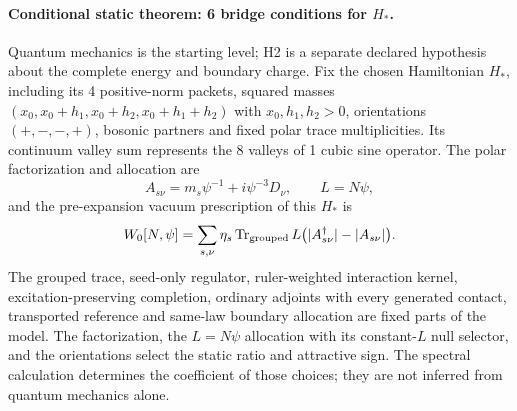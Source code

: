 
\paragraph*{Conditional static theorem: 6 bridge conditions for $H_*$.}
\label{sec:one-h-corollary}
Quantum mechanics is the starting level; H2 is a separate declared
hypothesis about the complete energy and boundary charge.
Fix the chosen Hamiltonian $H_*$, including its 4 positive-norm
packets, squared masses
$(x_0,x_0+h_1,x_0+h_2,x_0+h_1+h_2)$ with $x_0,h_1,h_2>0$,
orientations $(+,-,-,+)$, bosonic partners and fixed polar trace
multiplicities.  Its continuum valley sum represents the 8 valleys
of 1 cubic sine operator.  The polar factorization and allocation are
\[
 A_{s\nu}=m_s\psi^{-1}+i\psi^{-3}D_\nu,\qquad L=N\psi,
\]
and the pre-expansion vacuum prescription of this $H_*$ is
\begin{equation}\label{eq:bridgeconditions-polar-trace}
 W_0[N,\psi]
 =\sum_{s,\nu}\eta_s\operatorname{Tr}_{\rm grouped}
       L\bigl(|A_{s\nu}^\dagger|-|A_{s\nu}|\bigr).
\end{equation}
The grouped trace, seed-only regulator, ruler-weighted interaction
kernel, excitation-preserving completion, ordinary adjoints with
every generated contact, transported reference and same-law boundary
allocation are fixed parts of the model.  The factorization, the
$L=N\psi$ allocation with its constant-$L$ null selector, and the
orientations select the static ratio and attractive sign.  The
spectral calculation determines the coefficient of those choices;
they are not inferred from quantum mechanics alone.

